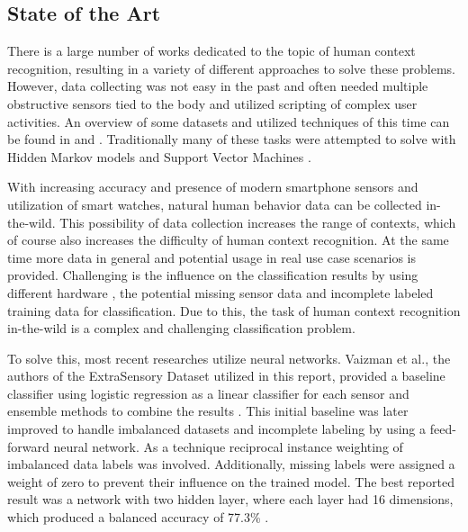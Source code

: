 \subsection{State of the Art}
There is a large number of works dedicated to the topic of human context recognition, resulting in a variety of different approaches to solve these problems. However, data collecting was not easy in the past and often needed multiple obstructive sensors tied to the body and utilized scripting of complex user activities. An overview of some datasets and utilized techniques of this time can be found in \cite{Ramasamy18} and \cite{Lara13}. Traditionally many of these tasks were attempted to solve with Hidden Markov models \cite{Lee11} and Support Vector Machines \cite{Anguita12}. 

With increasing accuracy and presence of modern smartphone sensors and utilization of smart watches, natural human behavior data can be collected in-the-wild. This possibility of data collection increases the range of contexts, which of course also increases the difficulty of human context recognition. At the same time more data in general and potential usage in real use case scenarios is provided.  Challenging is the influence on the classification results by using different hardware \cite{Stisen15}, the potential missing sensor data and incomplete labeled training data for classification. Due to this, the task of human context recognition in-the-wild is a complex and challenging classification problem. 

To solve this, most recent researches utilize neural networks. Vaizman et al., the authors of the \gl ExtraSensory Dataset\gr{} utilized in this report, provided a baseline classifier using logistic regression as a linear classifier for each sensor and ensemble methods to combine the results \cite{Vaizman17}. This initial baseline was later improved to handle imbalanced datasets and incomplete labeling by using a feed-forward neural network. As a technique reciprocal instance weighting of imbalanced data labels was involved. Additionally, missing labels were assigned a weight of zero to prevent their influence on the trained model. The best reported result was a network with two hidden layer, where each layer had 16 dimensions, which produced a balanced accuracy of 77.3\% \cite{Vaizman18}. 

